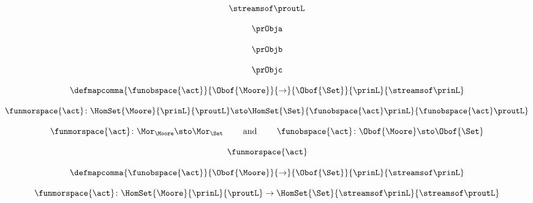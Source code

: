 \begin{forslides}
    \begin{equation}
        \label{eq:slides-processes-34}
        \streamsof\proutL
    \end{equation}

    \begin{equation}
        \label{eq:slides-processes-35}
        \prObja
    \end{equation}

    \begin{equation}
        \label{eq:slides-processes-36}
        \prObjb
    \end{equation}

    \begin{equation}
        \label{eq:slides-processes-37}
        \prObjc
    \end{equation}

    \begin{equation}
        \label{eq:slides-processes-38}
        \defmapcomma{\funobspace{\act}}
        {\Obof{\Moore}}
        {\to}
        {\Obof{\Set}}
        {\prinL}
        {\streamsof\prinL}
    \end{equation}

    \begin{equation}
        \label{eq:slides-processes-39}
        \funmorspace{\act} \colon  \HomSet{\Moore}{\prinL}{\proutL} \sto \HomSet{\Set}{ \funobspace{\act}\prinL}{\funobspace{\act}\proutL}
    \end{equation}

    \begin{equation}
        \label{eq:slides-processes-40}
        \funmorspace{\act} \colon \Mor_\Moore \sto \Mor_\Set \qquad \text{ and } \qquad \funobspace{\act} \colon \Obof{\Moore} \sto \Obof{\Set}
    \end{equation}

    \begin{equation}
        \label{eq:slides-processes-41}
        \funmorspace{\act}
    \end{equation}

    \begin{equation}
        \label{eq:slides-processes-42}
        \defmapcomma{\funobspace{\act}}
        {\Obof{\Moore}}
        {\to}
        {\Obof{\Set}}
        {\prinL}
        {\streamsof\prinL}
    \end{equation}

    \begin{equation}
        \label{eq:slides-processes-43}
        \funmorspace{\act} \colon  \HomSet{\Moore}{\prinL}{\proutL} \to \HomSet{\Set}{\streamsof\prinL }{\streamsof\proutL}
    \end{equation}


\end{forslides}
